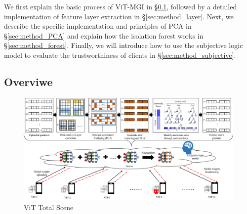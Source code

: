 \documentclass[conference]{IEEEtran}
\def\figTotalScene{\textwidth}
\begin{document}
We first explain the basic process of ViT-MGI in \hyperref[sec:method_basic]{§\ref{sec:method_basic}}, followed by a detailed implementation of feature layer extraction in \hyperref[sec:method_layer]{§\ref{sec:method_layer}}. Next, we describe the specific implementation and principles of PCA in \hyperref[sec:method_PCA]{§\ref{sec:method_PCA}} and explain how the isolation forest works in \hyperref[sec:method_forest]{§\ref{sec:method_forest}}. Finally, we will introduce how to use the subjective logic model to evaluate the trustworthiness of clients in \hyperref[sec:method_subjective]{§\ref{sec:method_subjective}}.

\subsection{Overviwe}
\label{sec:method_basic}

\begin{figure}[htbp]
    \centerline{\includegraphics[width=\figTotalScene]{pics/000-totalScene.pdf}}
    \caption{ViT Total Scene}
    \label{fig:totalScene}
\end{figure}


\end{document}
